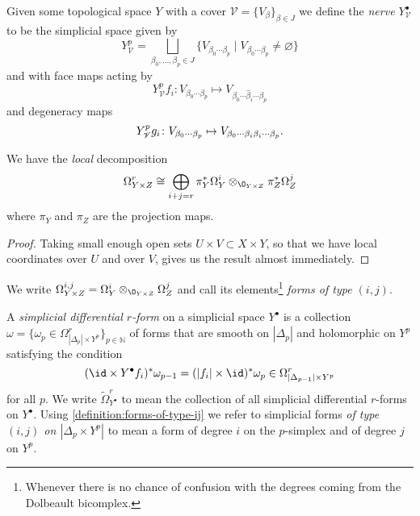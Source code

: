        \begin{definition}
            Given some topological space $Y$ with a cover $\mathscr{V}=\{V_\beta\}_{\beta\in J}$ we define the \emph{nerve $Y^\bullet_\mathscr{V}$} to be the simplicial space given by
            \[
                Y_\mathscr{V}^p = \bigsqcup_{\beta_0,\ldots,\beta_p\in J}\{V_{\beta_0\cdots\beta_p} \mid V_{\beta_0\cdots\beta_p}\neq\varnothing\}
            \]
            and with face maps acting by
            \[
                Y^p_\mathscr{V}f_i\colon V_{\beta_0\cdots\beta_p}\mapsto V_{\beta_0\cdots\hat{\beta}_i\cdots\beta_p}
            \]
            and degeneracy maps
            \[
                Y^p_\mathscr{V}g_i\colon V_{\beta_0\cdots\beta_p}\mapsto V_{\beta_0\cdots\beta_i\beta_i \cdots\beta_p}.\qedhere
            \]
        \end{definition}

        \begin{lemma}\label{lemma:forms-on-product-spaces}
            We have the \emph{local} decomposition
            \[
                \Omega_{Y\times Z}^r \cong \bigoplus_{i+j=r}\pi_Y^*\Omega_Y^i\otimes_{\O_{Y\times Z}}\pi_Z^*\Omega_Z^j
            \]
            where $\pi_Y$ and $\pi_Z$ are the projection maps.
        \end{lemma}

        \begin{proof}
            Taking small enough open sets $U\times V\subset X\times Y$, so that we have local coordinates over $U$ and over $V$, gives us the result almost immediately.
        \end{proof}

        \begin{definition}\label{definition:forms-of-type-ij}
            We write $\Omega^{i,j}_{Y\times Z} = \Omega_Y^i\otimes_{\O_{Y\times Z}}\Omega_Z^j$ and call its elements\footnote{Whenever there is no chance of confusion with the degrees coming from the Dolbeault bicomplex.} \emph{forms of type $(i,j)$}.
        \end{definition}

        \begin{definition}
            A \emph{simplicial differential $r$-form} on a simplicial space $Y^\bullet$ is a collection $\omega = \big\{\omega_p\in\Omega_{|\Delta_p|\times Y^p}^r\big\}_{p\in\mathbb{N}}$ of forms that are {smooth} on $|\Delta_p|$ and {holomorphic} on $Y^p$ satisfying the condition
            \[
                (\id\times Y^\bullet f_i)^*\omega_{p-1} = (|f_i|\times\id)^*\omega_{p}\in\Omega_{|\Delta_{p-1}|\times Y^p}^r
            \]
            for all $p$.
            We write $\widetilde{\Omega}_{Y^\bullet}^r$ to mean the collection of all simplicial differential $r$-forms on $Y^\bullet$.
            Using \cref{definition:forms-of-type-ij} we refer to simplicial forms \emph{of type $(i,j)$ on $|\Delta_p\times Y^p|$} to mean a form of degree $i$ on the $p$-simplex and of degree $j$ on $Y^p$.
        \end{definition}

